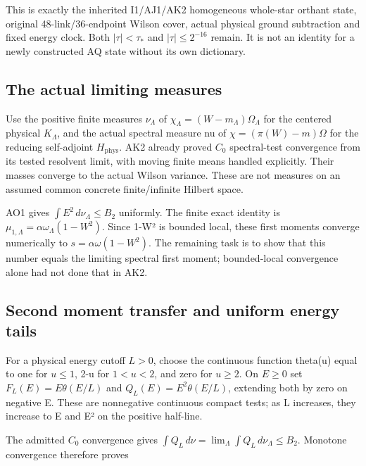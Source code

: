 This is exactly the inherited I1/AJ1/AK2 homogeneous whole-star orthant state, original 48-link/36-endpoint Wilson cover, actual physical ground subtraction and fixed energy clock. Both \(|\tau|<\tau_*\) and \(|\tau|\le 2^{-16}\) remain. It is not an identity for a newly constructed AQ state without its own dictionary.

\hypertarget{r29-ao2-the-actual-limiting-measures}{%
\subsection{The actual limiting measures}\label{r29:ao2:r29-ao2-the-actual-limiting-measures}}

Use the positive finite measures \(\nu_\Lambda\) of \(\chi_\Lambda=(W-m_\Lambda)\Omega_\Lambda\) for the centered physical \(K_\Lambda\), and the actual spectral measure nu of \(\chi=(\pi(W)-m)\Omega\) for the reducing self-adjoint \(H_{\mathrm{phys}}\). AK2 already proved \(C_0\) spectral-test convergence from its tested resolvent limit, with moving finite means handled explicitly. Their masses converge to the actual Wilson variance. These are not measures on an assumed common concrete finite/infinite Hilbert space.

AO1 gives \(\int E^2\,d\nu_\Lambda\le B_2\) uniformly. The finite exact identity is \(\mu_{1,\Lambda}=\alpha\omega_\Lambda(1-W^2)\). Since 1-W² is bounded local, these first moments converge numerically to \(s=\alpha\omega(1-W^2)\). The remaining task is to show that this number equals the limiting spectral first moment; bounded-local convergence alone had not done that in AK2.

\hypertarget{r29-ao2-second-moment-transfer-and-uniform-energy-tails}{%
\subsection{Second moment transfer and uniform energy tails}\label{r29:ao2:r29-ao2-second-moment-transfer-and-uniform-energy-tails}}

For a physical energy cutoff \(L>0\), choose the continuous function theta(u) equal to one for \(u\le 1\), 2-u for \(1<u<2\), and zero for \(u\ge 2\). On \(E\ge 0\) set \(F_L(E)=E\theta(E/L)\) and \(Q_L(E)=E^2\theta(E/L)\), extending both by zero on negative E. These are nonnegative continuous compact tests; as L increases, they increase to E and E² on the positive half-line.

The admitted \(C_0\) convergence gives \(\int Q_L\,d\nu=\lim_\Lambda\int Q_L\,d\nu_\Lambda\le B_2\). Monotone convergence therefore proves

